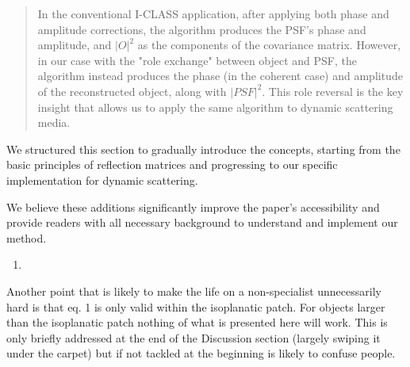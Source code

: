 \documentclass[12pt]{article}
\newenvironment{solved_reviewercomment}
    {\begin{tcolorbox}[width=\linewidth,colback=gray!5,colframe=solved_commentcolor!50,title=Reviewer Comment,left=5pt,right=5pt]}
    {\end{tcolorbox}}
\newenvironment{ourresponse}
    {\begin{tcolorbox}[width=\linewidth,breakable,enhanced,colback=gray!5,colframe=responsecolor!50,title=Response,left=5pt,right=5pt]}
    {\end{tcolorbox}}
\begin{document}
\begin{ourresponse}
\begin{quote}
In the conventional I-CLASS application, after applying both phase and amplitude corrections, the algorithm produces the PSF's phase and amplitude, and $|O|^2$ as the components of the covariance matrix. However, in our case with the "role exchange" between object and PSF, the algorithm instead produces the phase (in the coherent case) and amplitude of the reconstructed object, along with $|PSF|^2$. This role reversal is the key insight that allows us to apply the same algorithm to dynamic scattering media.
    
\end{quote}

We structured this section to gradually introduce the concepts, starting from the basic principles of reflection matrices and progressing to our specific implementation for dynamic scattering.

We believe these additions significantly improve the paper's accessibility and provide readers with all necessary background to understand and implement our method.

\end{ourresponse}


\begin{enumerate}[label=\arabic*., resume]
\item \leavevmode
\end{enumerate}
\vspace{-1em}
\begin{solved_reviewercomment}
    Another point that is likely to make the life on a non-specialist unnecessarily hard is that eq. 1 is only valid within the isoplanatic patch. For objects larger than the isoplanatic patch nothing of what is presented here will work. This is only briefly addressed at the end of the Discussion section (largely swiping it under the carpet) but if not tackled at the beginning is likely to confuse people.
    
\end{solved_reviewercomment}
\end{document}
